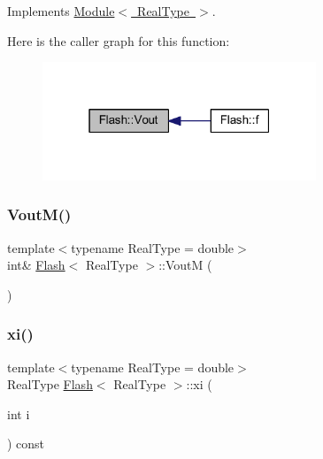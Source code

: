 Implements \mbox{\hyperlink{class_module_ae479ac97ae43fd740cdd44b947b952d9}{Module$<$ Real\+Type $>$}}.

Here is the caller graph for this function\+:\nopagebreak
\begin{figure}[H]
\begin{center}
\leavevmode
\includegraphics[width=232pt]{class_flash_aadd1e6c91da7d8a56b69f815b4346c5b_icgraph}
\end{center}
\end{figure}
\mbox{\label{class_flash_adba4e13cb3bbf4f3c2e9fbef7f4e13c1}} 
\subsubsection{\texorpdfstring{Vout\+M()}{VoutM()}}
{\footnotesize\ttfamily template$<$typename Real\+Type = double$>$ \\
int\& \mbox{\hyperlink{class_flash}{Flash}}$<$ Real\+Type $>$\+::VoutM (\begin{DoxyParamCaption}{ }\end{DoxyParamCaption})\hspace{0.3cm}{\ttfamily [inline]}}

\mbox{\label{class_flash_abf2fb32491f3e75427ad25dadd7af546}} 
\subsubsection{\texorpdfstring{xi()}{xi()}}
{\footnotesize\ttfamily template$<$typename Real\+Type = double$>$ \\
Real\+Type \mbox{\hyperlink{class_flash}{Flash}}$<$ Real\+Type $>$\+::xi (\begin{DoxyParamCaption}\item[{int}]{i }\end{DoxyParamCaption}) const\hspace{0.3cm}{\ttfamily [inline]}}

